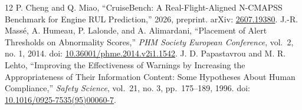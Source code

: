 \documentclass[preprint,12pt]{elsarticle}
\begin{document}
\begin{thebibliography}{12}
 P. Cheng and Q. Miao, ``CruiseBench: A Real-Flight-Aligned N-CMAPSS Benchmark for Engine RUL Prediction,'' 2026, preprint. arXiv: \href{https://arxiv.org/abs/2607.19380}{2607.19380}.
 J.-R. Massé, A. Humeau, P. Lalonde, and A. Alimardani, ``Placement of Alert Thresholds on Abnormality Scores,'' \emph{PHM Society European Conference}, vol.~2, no. 1, 2014. doi: \href{https://doi.org/10.36001/phme.2014.v2i1.1542}{10.36001/phme.2014.v2i1.1542}.
 J. D. Papastavrou and M. R. Lehto, ``Improving the Effectiveness of Warnings by Increasing the Appropriateness of Their Information Content: Some Hypotheses About Human Compliance,'' \emph{Safety Science}, vol.~21, no. 3, pp.~175--189, 1996. doi: \href{https://doi.org/10.1016/0925-7535(95)00060-7}{10.1016/0925-7535(95)00060-7}.
\end{thebibliography}
\end{document}
